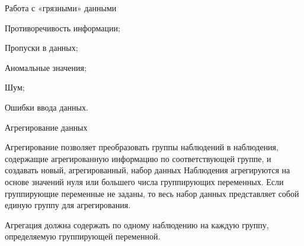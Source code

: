 \documentclass{beamer}
\begin{document}
\begin{frame}{Работа с «грязными» данными}

Противоречивость информации;

Пропуски в данных;

Аномальные значения;

Шум;

Ошибки ввода данных. 

\end{frame}

  
  









  










\begin{frame}{Агрегирование данных} 

Агрегирование  позволяет преобразовать группы наблюдений в наблюдения,
 содержащие агрегированную информацию по соответствующей группе, 
 и создавать новый, агрегированный, набор  данных Наблюдения агрегируются 
 на основе значений нуля или большего числа группирующих переменных. 
 Если группирующие переменные не заданы, то весь набор данных представляет 
 собой единую группу для агрегирования.

 Агрегация должна  содержать по одному наблюдению на каждую группу, определяемую группирующей переменной. 

\end{frame}
\end{document}

